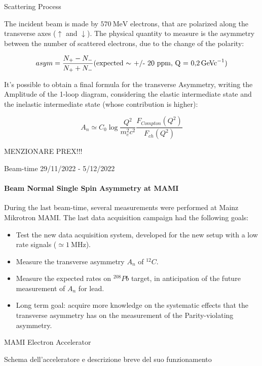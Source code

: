 \documentclass[8pt,a4paper]{beamer}
\begin{document}
\begin{frame}{Scattering Process}

The incident beam is made by $\SI{570}{\mega \electronvolt}$ electrons, that are polarized along the transverse axes ($\uparrow$ and $\downarrow$). The physical quantity to measure is the asymmetry between the number of scattered electrons, due to the change of the polarity:

\begin{equation}
asym = \frac{N_{+} - N_{-}}{N_{+} + N_{-}} \text{(expected $\sim$ +/- 20 ppm, Q = \SI{0.2}{\giga\electronvolt c^{-1}})}
\end{equation}

It's possible to obtain a final formula for the transverse Asymmetry, writing the Amplitude of the 1-loop diagram, considering the elastic intermediate state and the inelastic intermediate state (whose contribution is higher):

\begin{equation}
A_{n} \simeq C_{0} \log \frac{Q^{2}}{m^2_e c^2} \frac{F_{Compton} (Q^2)}{F_{ch}(Q^2)}
\end{equation}

MENZIONARE PREX!!!

\end{frame}


\begin{frame}{Beam-time 29/11/2022 - 5/12/2022}
\framesubtitle{Beam Normal Single Spin Asymmetry at MAMI}
During the last beam-time, several measurements were performed at Mainz Mikrotron MAMI. The last data acquisition campaign had the following goals:

\begin{itemize}
\item Test the new data acquisition system, developed for the new setup with a low rate signals ($\simeq \SI{1}{\mega \hertz} $). 
\item Measure the transverse asymmetry $A_{n}$ of $^{12}C$.
\item Measure the expected rates on $^{208}Pb$ target, in anticipation of the future measurement of $A_{n}$ for lead. 
\item Long term goal: acquire more knowledge on the systematic effects that the transverse asymmetry has on the measurement of the Parity-violating asymmetry.
\end{itemize}
\end{frame}

\begin{frame}{MAMI Electron Accelerator}

Schema dell'acceleratore e descrizione breve del suo funzionamento

\end{frame}
\end{document}
